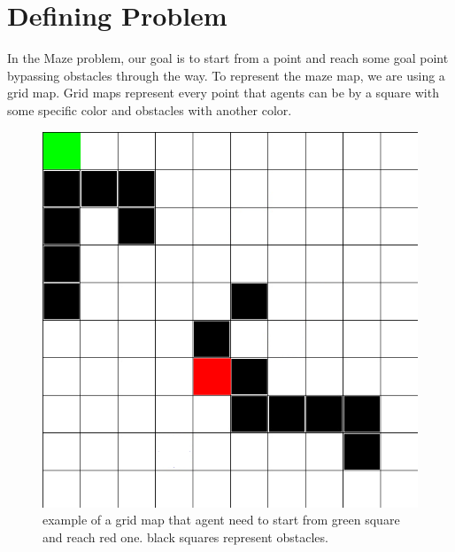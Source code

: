 \section{Defining Problem}
In the Maze problem, our goal is to 
start from a point and reach some goal 
point bypassing obstacles through the way. 
To represent the maze map, we are using a grid map. 
Grid maps represent every point that agents can be by 
a square with some specific color and obstacles with 
another color.
\begin{figure}[H]
    \centering
  \includegraphics[width = .5\textwidth ]{images/map.png}
  \caption{example of a grid map that agent need to start from green
            square and reach red one. black squares represent obstacles.}
  \label{fig:gird-map}
\end{figure}